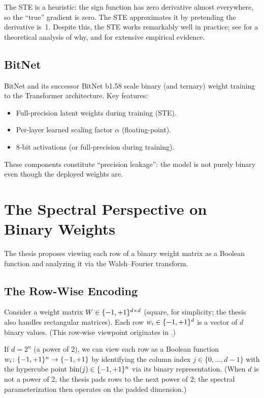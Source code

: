 The STE is a heuristic: the sign function has zero derivative almost
everywhere, so the ``true'' gradient is zero. The STE approximates it by
pretending the derivative is~1. Despite this, the STE works remarkably
well in practice; see \citet{yin2019understanding} for a theoretical
analysis of why, and \citet{hubara2016binarized} for extensive empirical
evidence.

\subsection{BitNet}\label{sec:bitnet}

BitNet \citep{wang2023bitnet} and its successor BitNet b1.58
\citep{ma2024era} scale binary (and ternary) weight training to the
Transformer architecture. Key features:
\begin{itemize}
  \item Full-precision latent weights during training (STE).
  \item Per-layer learned scaling factor $\alpha$ (floating-point).
  \item 8-bit activations (or full-precision during training).
\end{itemize}

These components constitute ``precision leakage'': the model is not
purely binary even though the deployed weights are.


\section{The Spectral Perspective on Binary Weights}\label{sec:spectral-perspective}

The thesis proposes viewing each row of a binary weight matrix as a
Boolean function and analyzing it via the Walsh--Fourier transform.

\subsection{The Row-Wise Encoding}\label{sec:row-encoding}

Consider a weight matrix $W \in \{-1,+1\}^{d \times d}$ (square, for
simplicity; the thesis also handles rectangular matrices). Each row
$w_i \in \{-1,+1\}^d$ is a vector of $d$ binary values.
(This row-wise viewpoint originates in
\citealp[\S1.3]{odonnell2014analysis}.)

If $d = 2^n$ (a power of 2), we can view each row as a Boolean function
$w_i \colon \{-1,+1\}^n \to \{-1,+1\}$ by identifying the column index
$j \in \{0, \ldots, d-1\}$ with the hypercube point $\text{bin}(j) \in \{-1,+1\}^n$
via its binary representation. (When $d$ is not a power of 2, the thesis
pads rows to the next power of 2; the spectral parameterization then
operates on the padded dimension.)

